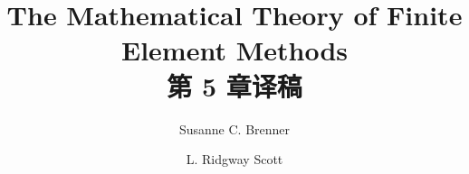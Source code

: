\documentclass[a4paper,UTF8,12pt]{ctexart}
\title{The Mathematical Theory of Finite Element Methods\\第 5 章译稿}
\author{Susanne C. Brenner \and L. Ridgway Scott}
\date{}
\begin{document}
\maketitle
\setcounter{section}{4}
\renewcommand{\thethmcount}{\thesubsection.\arabic{thmcount}}
\renewcommand{\theequation}{\thesubsection.\arabic{equation}}
\renewcommand{\thefigure}{\thesection.\arabic{figure}}
\renewcommand{\thetable}{\thesection.\arabic{table}}

\end{document}

